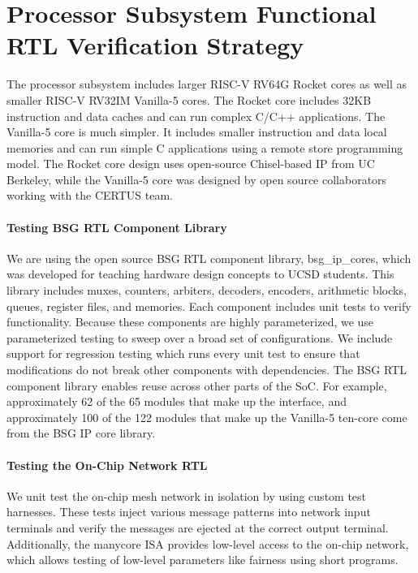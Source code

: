 
\section{Processor Subsystem Functional RTL Verification Strategy}

The processor subsystem includes larger RISC-V RV64G Rocket cores as well
as smaller RISC-V RV32IM Vanilla-5 cores. The Rocket core includes 32KB
instruction and data caches and can run complex C/C++ applications. The
Vanilla-5 core is much simpler. It includes smaller instruction and data
local memories and can run simple C applications using a remote store
programming model. The Rocket core design uses open-source Chisel-based
IP from UC Berkeley, while the Vanilla-5 core was designed by open source collaborators working with the CERTUS
team.

\paragraph{Testing BSG RTL Component Library}
We are using the open source BSG RTL component library, bsg\_ip\_cores, which was developed for teaching hardware design concepts to UCSD students.
This library includes muxes, counters, arbiters, decoders, encoders,
arithmetic blocks, queues, register files, and memories. Each component
includes unit tests to verify functionality. Because these components are
highly parameterized, we use parameterized testing to sweep over a broad
set of configurations. We include support for regression testing which
runs every unit test to ensure that modifications do not break other
components with dependencies. The BSG RTL component library enables reuse
across other parts of the SoC. For example, approximately 62 of the 65
modules that make up the  interface, and approximately 100 of
the 122 modules that make up the Vanilla-5 ten-core come from the BSG IP
core library. 

\paragraph{Testing the On-Chip Network RTL}
We unit test the on-chip mesh network in isolation by using custom test
harnesses. These tests inject various message patterns into network input
terminals and verify the messages are ejected at the correct output
terminal. Additionally, the manycore ISA provides low-level access to the on-chip network, which allows testing of low-level parameters like fairness using short programs.

